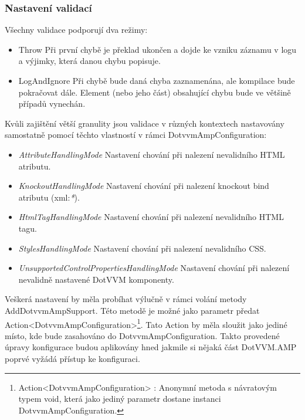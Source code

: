 \subsubsection{Nastavení validací} \label{validationModes}
Všechny validace podporují dva režimy:
\begin{itemize}
    \item Throw \newline
    Při první chybě je překlad ukončen a dojde ke vzniku záznamu v logu a výjimky, která danou chybu popisuje.
    \item LogAndIgnore \newline
    Při chybě bude daná chyba zaznamenána, ale kompilace bude pokračovat dále. Element (nebo jeho část) obsahující chybu bude ve většině případů vynechán.
\end{itemize}
Kvůli zajištění větší granulity jsou validace v různých kontextech nastavovány samostatně pomocí těchto vlastností v rámci DotvvmAmpConfiguration: 
\begin{itemize}
    \item \textit{AttributeHandlingMode} \newline
    Nastavení chování při nalezení nevalidního HTML atributu.
    \item \textit{KnockoutHandlingMode}\newline
    Nastavení chování při nalezení knockout bind atributu (xml:\textit{*}).
    \item \textit{HtmlTagHandlingMode}\newline
    Nastavení chování při nalezení nevalidního HTML tagu.
    \item \textit{StylesHandlingMode}\newline
    Nastavení chování při nalezení nevalidního CSS.
    \item \textit{UnsupportedControlPropertiesHandlingMode}\newline
    Nastavení chování při nalezení nevalidně nastavené DotVVM komponenty.
\end{itemize}

Veškerá nastavení by měla probíhat výlučně v rámci volání metody AddDotvvmAmpSupport. Této metodě je možné jako parametr předat Action<DotvvmAmpConfiguration>\footnote{Action<DotvvmAmpConfiguration> : Anonymní metoda s návratovým typem void, která jako jediný parametr dostane instanci DotvvmAmpConfiguration.}. Tato Action by měla sloužit jako jediné místo, kde bude zasahováno do DotvvmAmpConfiguration. Takto provedené úpravy konfigurace budou aplikovány hned jakmile si nějaká část DotVVM.AMP poprvé vyžádá přístup ke konfiguraci.

